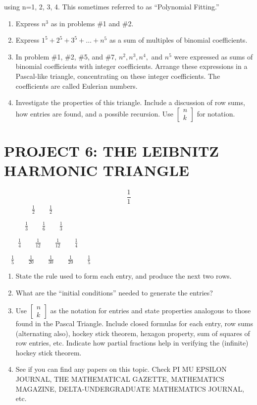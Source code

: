 \documentclass{article}
\begin{document}
 using n=1, 2, 3, 4. This sometimes referred to as “Polynomial Fitting.”

\begin{enumerate}
\item Express $n^3$ as in problems \#1 and \#2. 
\item Express $1^5+2^5+3^5+{\dots}+n^5$ as a sum of multiples of binomial coefficients. 
\item In problem \#1, \#2, \#5, and \#7,  $n^2,n^3,n^4,$ and  $n^5$ were expressed as sums of binomial coefficients with
integer coefficients. Arrange these expressions in a Pascal-like triangle, concentrating on these integer coefficients.
The coefficients are called Eulerian numbers. 
\item Investigate the properties of this triangle. Include a discussion of row sums, how entries are found, and a
possible recursion. Use  $\left[\begin{matrix}n\\k\end{matrix}\right]$ for notation. 
\end{enumerate}
\section[PROJECT 6: THE LEIBNITZ HARMONIC TRIANGLE]{PROJECT 6: THE LEIBNITZ HARMONIC TRIANGLE}
\begin{equation*}
\frac 1 1
\end{equation*}
\ \ \ \ \ \ \ \  $\frac 1 2$\ \ \ \  $\frac 1 2$

\ \ \ \ \ \  $\frac 1 3$\ \ \ \  $\frac 1 6$\ \ \ \  $\frac 1 3$

\ \ \ \  $\frac 1 4$\ \ \ \  $\frac 1{12}$\ \ \ \  $\frac 1{12}$\ \ \ \  $\frac 1 4$

\ \  $\frac 1 5$\ \ \ \  $\frac 1{20}$\ \ \ \  $\frac 1{30}$\ \ \ \  $\frac 1{20}$\ \ \ \  $\frac 1 5$

\begin{enumerate}
\item State the rule used to form each entry, and produce the next two rows. 
\item What are the “initial conditions” needed to generate the entries?
\item Use  $\left[\begin{matrix}n\\k\end{matrix}\right]$ as the notation for entries and state properties analogous to
those found in the Pascal Triangle. Include closed formulas for each entry, row sums (alternating also), hockey stick
theorem, hexagon property, sum of squares of row entries, etc. Indicate how partial fractions help in verifying the
(infinite) hockey stick theorem.  
\item See if you can find any papers on this topic. Check PI MU EPSILON JOURNAL, THE MATHEMATICAL GAZETTE, MATHEMATICS
MAGAZINE, DELTA-UNDERGRADUATE MATHEMATICS JOURNAL, etc. 
\end{enumerate}
\end{document}
